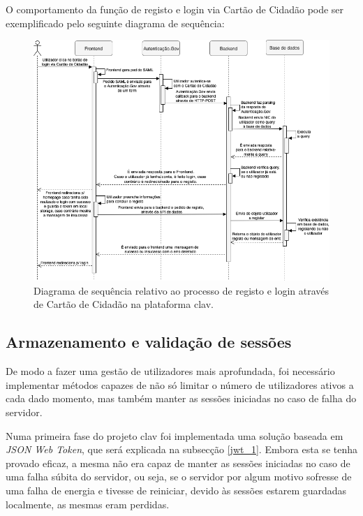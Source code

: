 O comportamento da função de registo e login via Cartão de Cidadão pode ser exemplificado pelo seguinte diagrama de sequência:

\vspace{5mm}
\begin{figure}[H]
    \centering
    \includegraphics[width=\textwidth]{img/diagramas/sequencia/DiagramasSequencia-LoginCC.png}
    \caption{Diagrama de sequência relativo ao processo de registo e login através de Cartão de Cidadão na plataforma \gls{clav}.}
    \label{fig:diagramaSequenciaCC}
\end{figure}

\cleardoublepage
\subsection{Armazenamento e validação de sessões}

De modo a fazer uma gestão de utilizadores mais aprofundada, foi necessário implementar métodos capazes de não só limitar o número de utilizadores ativos a cada dado momento, mas também manter as sessões iniciadas no caso de falha do servidor.

Numa primeira fase do projeto \gls{clav} foi implementada uma solução baseada em \emph{JSON Web Token}, que será explicada na subsecção \ref{jwt_1}. Embora esta se tenha provado eficaz, a mesma não era capaz de manter as sessões iniciadas no caso de uma falha súbita do servidor, ou seja, se o servidor por algum motivo sofresse de uma falha de energia e tivesse de reiniciar, devido às sessões estarem guardadas localmente, as mesmas eram perdidas.

